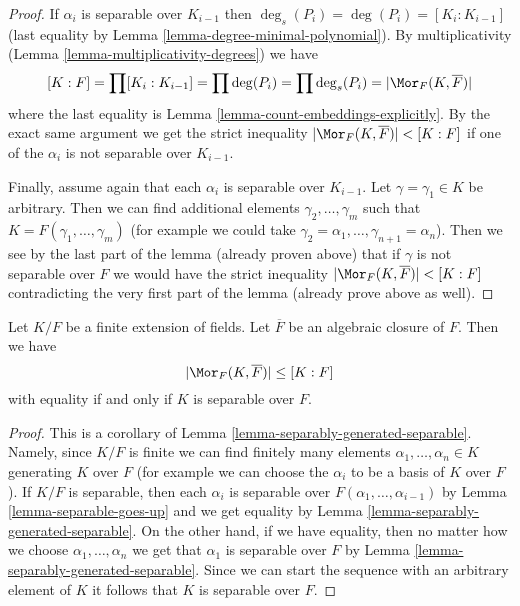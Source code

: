 \begin{proof}
If $\alpha_i$ is separable over $K_{i - 1}$ then
$\deg_s(P_i) = \deg(P_i) = [K_i : K_{i - 1}]$
(last equality by Lemma \ref{lemma-degree-minimal-polynomial}).
By multiplicativity (Lemma \ref{lemma-multiplicativity-degrees}) we have
$$
[K : F] = \prod [K_i : K_{i - 1}] = \prod \deg(P_i) =
\prod \deg_s(P_i) = |\Mor_F(K, \overline{F})|
$$
where the last equality is Lemma \ref{lemma-count-embeddings-explicitly}.
By the exact same argument we get the strict inequality
$|\Mor_F(K, \overline{F})| < [K : F]$ if one of the $\alpha_i$ is
not separable over $K_{i - 1}$.

\medskip\noindent
Finally, assume again that each $\alpha_i$ is separable over $K_{i - 1}$.
Let $\gamma = \gamma_1 \in K$ be arbitrary. Then we can find additional
elements $\gamma_2, \ldots, \gamma_m$ such that
$K = F(\gamma_1, \ldots, \gamma_m)$ (for example we could take
$\gamma_2 = \alpha_1, \ldots, \gamma_{n + 1} = \alpha_n$).
Then we see by the last part of the lemma (already proven above)
that if $\gamma$ is not separable over $F$ we would have the
strict inequality $|\Mor_F(K, \overline{F})| < [K : F]$
contradicting the very first part of the lemma (already prove above
as well).
\end{proof}

\begin{lemma}
\label{lemma-separable-equality}
Let $K/F$ be a finite extension of fields. Let $\overline{F}$ be an
algebraic closure of $F$. Then we have
$$
|\Mor_F(K, \overline{F})| \leq [K : F]
$$
with equality if and only if $K$ is separable over $F$.
\end{lemma}

\begin{proof}
This is a corollary of Lemma \ref{lemma-separably-generated-separable}.
Namely, since $K/F$ is finite we can find finitely many elements
$\alpha_1, \ldots, \alpha_n \in K$ generating $K$ over $F$ (for example
we can choose the $\alpha_i$ to be a basis of $K$ over $F$).
If $K/F$ is separable, then each $\alpha_i$ is separable over
$F(\alpha_1, \ldots, \alpha_{i - 1})$ by Lemma \ref{lemma-separable-goes-up}
and we get equality by Lemma \ref{lemma-separably-generated-separable}.
On the other hand, if we have equality, then no matter how we choose
$\alpha_1, \ldots, \alpha_n$ we get that $\alpha_1$ is separable over
$F$ by Lemma \ref{lemma-separably-generated-separable}. Since we
can start the sequence with an arbitrary element of $K$ it follows
that $K$ is separable over $F$.
\end{proof}

